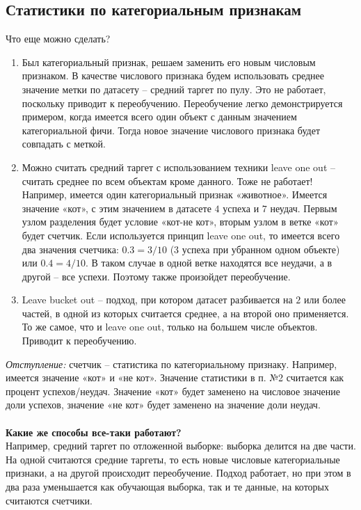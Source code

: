 \documentclass[a4paper,12pt]{article}
\begin{document}
\subsection{Статистики по категориальным признакам}
Что еще можно сделать?
\begin{enumerate}[noitemsep]
\item Был категориальный признак, решаем заменить его новым числовым признаком. В качестве числового признака будем использовать среднее значение метки по датасету – средний таргет по пулу. Это не работает, поскольку приводит к переобучению. Переобучение легко демонстрируется примером, когда имеется всего один объект с данным значением категориальной фичи. Тогда новое значение числового признака будет совпадать с меткой. 
\item Можно считать средний таргет с использованием техники leave one out – считать среднее по всем объектам кроме данного. Тоже не работает! Например, имеется один категориальный признак «животное». Имеется значение «кот», с этим значением в датасете $4$ успеха и $7$ неудач. Первым узлом разделения будет условие «кот-не кот», вторым узлом в ветке «кот» будет счетчик. Если используется принцип leave one out, то имеется всего два значения счетчика: $0.3 = 3/10$ (3 успеха при убранном одном объекте) или $0.4 = 4/10$. В таком случае в одной ветке находятся все неудачи, а в другой – все успехи. Поэтому также произойдет переобучение.
\item Leave bucket out – подход, при котором датасет разбивается на $2$ или более частей, в одной из которых считается среднее, а на второй оно применяется. То же самое, что и leave one out, только на большем числе объектов. Приводит к переобучению.
\end{enumerate}

\textit{Отступление:} счетчик – статистика по категориальному признаку. Например, имеется значение «кот» и «не кот». Значение статистики в п. №2 считается как процент успехов/неудач. Значение «кот» будет заменено на числовое значение доли успехов, значение «не кот» будет заменено на значение доли неудач. \\
\\

\textbf{Какие же способы все-таки работают?} \\

Например, средний таргет по отложенной выборке: выборка делится на две части. На одной считаются средние таргеты, то есть новые числовые категориальные признаки, а на другой происходит переобучение. Подход работает, но при этом в два раза уменьшается как обучающая выборка, так и те данные, на которых считаются счетчики. \\
 
\end{document}
